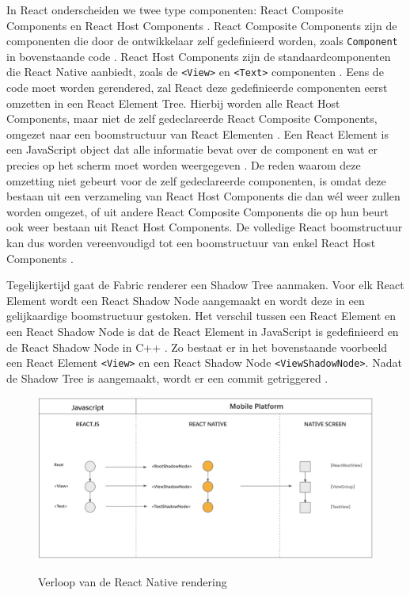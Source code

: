In React onderscheiden we twee type componenten: React Composite Components en React Host Components \autocite{Bron15}. React Composite Components zijn de componenten die door de ontwikkelaar zelf gedefinieerd worden, zoals \verb|Component| in bovenstaande code \autocite{Bron16}. React Host Components zijn de standaardcomponenten die React Native aanbiedt, zoals de \verb|<View>| en \verb|<Text>| componenten \autocite{Bron16}. Eens de code moet worden gerendered, zal React deze gedefinieerde componenten eerst omzetten in een React Element Tree. Hierbij worden alle React Host Components, maar niet de zelf gedeclareerde React Composite Components, omgezet naar een boomstructuur van React Elementen \autocite{Bron15}. Een React Element is een JavaScript object dat alle informatie bevat over de component en wat er precies op het scherm moet worden weergegeven \autocite{Bron16}. De reden waarom deze omzetting niet gebeurt voor de zelf gedeclareerde componenten, is omdat deze bestaan uit een verzameling van React Host Components die dan wél weer zullen worden omgezet, of uit andere React Composite Components die op hun beurt ook weer bestaan uit React Host Components. De volledige React boomstructuur kan dus worden vereenvoudigd tot een boomstructuur van enkel React Host Components \autocite{Bron15}.

Tegelijkertijd gaat de Fabric renderer een Shadow Tree aanmaken. Voor elk React Element wordt een React Shadow Node aangemaakt en wordt deze in een gelijkaardige boomstructuur gestoken. Het verschil tussen een React Element en een React Shadow Node is dat de React Element in JavaScript is gedefinieerd en de React Shadow Node in C++ \autocite{Bron16}. Zo bestaat er in het bovenstaande voorbeeld een React Element \verb|<View>| en een React Shadow Node \verb|<ViewShadowNode>|. Nadat de Shadow Tree is aangemaakt, wordt er een commit getriggered \autocite{Bron15}.

\begin{figure}
  \centering
  \includegraphics[width=0.9\linewidth]{img/reactNativeRender}
  \caption{Verloop van de React Native rendering}
  \label{fig:Verloop van de React Native rendering} \autocite{Bron15IMG}
\end{figure}

